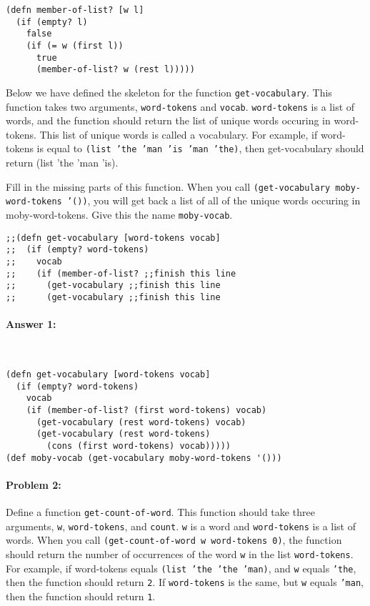 \documentclass[12pt, letterpaper]{article}
\begin{document}
\begin{lstlisting}
(defn member-of-list? [w l]
  (if (empty? l)
    false
    (if (= w (first l))
      true
      (member-of-list? w (rest l)))))
\end{lstlisting}

Below we have defined the skeleton for the function
\texttt{get-vocabulary}. This function takes two arguments,
\texttt{word-tokens} and \texttt{vocab}. \texttt{word-tokens} is a
list of words, and the function should return the list of unique words
occuring in word-tokens. This list of unique words is called a
vocabulary. For example, if word-tokens is equal to \texttt{(list 'the
  'man 'is 'man 'the)}, then get-vocabulary should return (list 'the
'man 'is).

Fill in the missing parts of this function. When you call
\texttt{(get-vocabulary moby-word-tokens '())}, you will get back a
list of all of the unique words occuring in moby-word-tokens. Give
this the name \texttt{moby-vocab}.

\begin{lstlisting}
;;(defn get-vocabulary [word-tokens vocab]
;;  (if (empty? word-tokens)
;;    vocab
;;    (if (member-of-list? ;;finish this line
;;      (get-vocabulary ;;finish this line
;;      (get-vocabulary ;;finish this line
\end{lstlisting}

\paragraph{Answer 1:}~\begin{lstlisting}
(defn get-vocabulary [word-tokens vocab]
  (if (empty? word-tokens)
    vocab
    (if (member-of-list? (first word-tokens) vocab)
      (get-vocabulary (rest word-tokens) vocab)
      (get-vocabulary (rest word-tokens)
        (cons (first word-tokens) vocab)))))
(def moby-vocab (get-vocabulary moby-word-tokens '()))
\end{lstlisting}

\hrulefill
\paragraph{Problem 2:}

Define a function \texttt{get-count-of-word}. This function should
take three arguments, \texttt{w}, \texttt{word-tokens}, and
\texttt{count}. \texttt{w} is a word and \texttt{word-tokens} is a
list of words. When you call \texttt{(get-count-of-word w word-tokens
  0)}, the function should return the number of occurrences of the
word \texttt{w} in the list \texttt{word-tokens}. For example, if
word-tokens equals \texttt{(list 'the 'the 'man)}, and \texttt{w}
equals \texttt{'the}, then the function should return \texttt{2}. If
\texttt{word-tokens} is the same, but \texttt{w} equals \texttt{'man},
then the function should return \texttt{1}.
\end{document}
